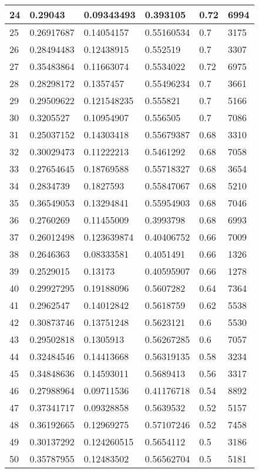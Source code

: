\begin{longtable}{|l|l|l|l|l|l|}
24 & 0.29043 & 0.09343493 & 0.393105 & 0.72 & 6994 \\ \hline 
25 & 0.26917687 & 0.14054157 & 0.55160534 & 0.7 & 3175 \\ \hline 
26 & 0.28494483 & 0.12438915 & 0.552519 & 0.7 & 3307 \\ \hline 
27 & 0.35483864 & 0.11663074 & 0.5534022 & 0.72 & 6975 \\ \hline 
28 & 0.28298172 & 0.1357457 & 0.55496234 & 0.7 & 3661 \\ \hline 
29 & 0.29509622 & 0.121548235 & 0.555821 & 0.7 & 5166 \\ \hline 
30 & 0.3205527 & 0.10954907 & 0.556505 & 0.7 & 7086 \\ \hline 
31 & 0.25037152 & 0.14303418 & 0.55679387 & 0.68 & 3310 \\ \hline 
32 & 0.30029473 & 0.11222213 & 0.5461292 & 0.68 & 7058 \\ \hline 
33 & 0.27654645 & 0.18769588 & 0.55718327 & 0.68 & 3654 \\ \hline 
34 & 0.2834739 & 0.1827593 & 0.55847067 & 0.68 & 5210 \\ \hline 
35 & 0.36549053 & 0.13294841 & 0.55954903 & 0.68 & 7046 \\ \hline 
36 & 0.2760269 & 0.11455009 & 0.3993798 & 0.68 & 6993 \\ \hline 
37 & 0.26012498 & 0.123639874 & 0.40406752 & 0.66 & 7009 \\ \hline 
38 & 0.2646363 & 0.08333581 & 0.4051491 & 0.66 & 1326 \\ \hline 
39 & 0.2529015 & 0.13173 & 0.40595907 & 0.66 & 1278 \\ \hline 
40 & 0.29927295 & 0.19188096 & 0.5607282 & 0.64 & 7364 \\ \hline 
41 & 0.2962547 & 0.14012842 & 0.5618759 & 0.62 & 5538 \\ \hline 
42 & 0.30873746 & 0.13751248 & 0.5623121 & 0.6 & 5530 \\ \hline 
43 & 0.29502818 & 0.1305913 & 0.56267285 & 0.6 & 7057 \\ \hline 
44 & 0.32484546 & 0.14413668 & 0.56319135 & 0.58 & 3234 \\ \hline 
45 & 0.34848636 & 0.14593011 & 0.5689413 & 0.56 & 3317 \\ \hline 
46 & 0.27988964 & 0.09711536 & 0.41176718 & 0.54 & 8892 \\ \hline 
47 & 0.37341717 & 0.09328858 & 0.5639532 & 0.52 & 5157 \\ \hline 
48 & 0.36192665 & 0.12969275 & 0.57107246 & 0.52 & 7458 \\ \hline 
49 & 0.30137292 & 0.124260515 & 0.5654112 & 0.5 & 3186 \\ \hline 
50 & 0.35787955 & 0.12483502 & 0.56562704 & 0.5 & 5181 \\ \hline 
\end{longtable}